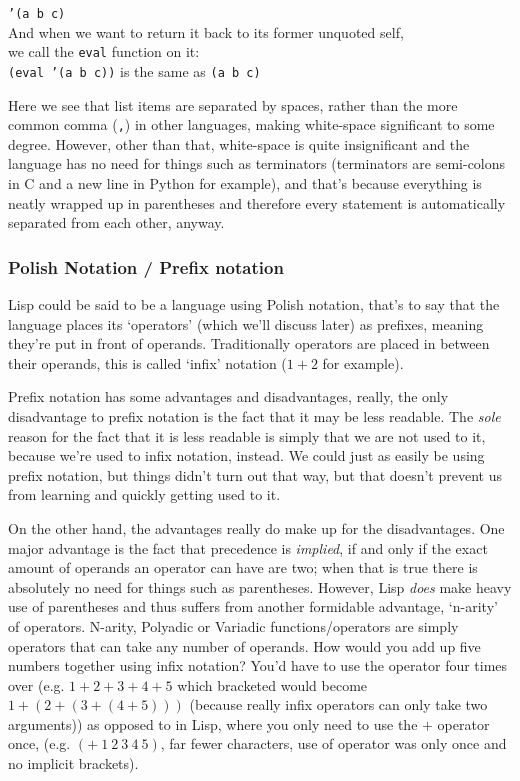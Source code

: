 \documentclass{article}
\newcommand{\code}[1]{\texttt{#1}}
\begin{document}
    \begin{center}
      \code{'(a b c)}\\
      And when we want to return it back to its former unquoted self,\\
      we call the \code{eval} function on it:\\
      \code{(eval '(a b c))} is the same as \code{(a b c)}
    \end{center}

    Here we see that list items are separated by spaces, rather than the more
    common comma (\code{,}) in other languages, making white-space significant to some
    degree. However, other than that, white-space is quite insignificant and
    the language has no need for things such as terminators (terminators are
    semi-colons in C and a new line in Python for example), and that's because
    everything is neatly wrapped up in parentheses and therefore every statement
    is automatically separated from each other, anyway.

    \subsubsection{Polish Notation / Prefix notation}
    Lisp could be said to be a language using Polish notation, that's to say
    that the language places its `operators' (which we'll discuss later) as prefixes,
    meaning they're put in front of operands.  Traditionally operators are placed in
    between their operands, this is called `infix' notation ($1 + 2$ for example).

    Prefix notation has some advantages and disadvantages, really, the only
    disadvantage to prefix notation is the fact that it may be less readable.
    The \emph{sole} reason for the fact that it is less readable is simply
    that we are not used to it, because we're used to infix notation, instead.
    We could just as easily be using prefix notation, but things didn't turn out
    that way, but that doesn't prevent us from learning and quickly getting used
    to it.

    On the other hand, the advantages really do make up for the disadvantages.
    One major advantage is the fact that precedence is \emph{implied}, if and only if
    the exact amount of operands an operator can have are two; when that is true
    there is absolutely no need for things such as parentheses. However, Lisp
    \emph{does} make heavy use of parentheses and thus suffers from another
    formidable advantage, `n-arity' of operators. N-arity, Polyadic or Variadic
    functions/operators are simply operators that can take any number of operands.
    How would you add up five numbers together using infix notation?
    You'd have to use the operator four times over (e.g. $1 + 2 + 3 + 4 + 5$
    which bracketed would become $1 + (2 + (3 + (4 + 5)))$ (because really infix
    operators can only take two arguments)) as opposed to in Lisp, where you only
    need to use the $+$ operator once, (e.g. $(+\ 1\ 2\ 3\ 4\ 5)$, far fewer
    characters, use of operator was only once and no implicit brackets).
\end{document}
